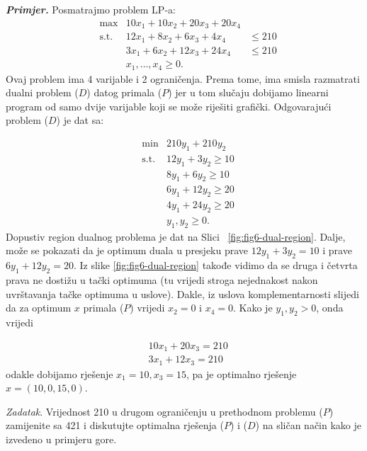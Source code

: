 \documentclass[a4paper, utf8, 11pt, colorlinks]{book}
\begin{document}
\emph{\textbf{Primjer.}} Posmatrajmo problem LP-a:
$$\begin{array}{llll}
   &\max                     &10 x_1 + 10 x_2 + 20 x_3 + 20 x_4  & \\
   &\mbox{s.t. }      &12 x_1 + 8 x_2  + 6 x_3  + 4 x_4   & \leq 210 \\
    &                        &3 x_1 + 6 x_2   + 12 x_3 + 24 x_4 & \leq 210 \\
     &                       & x_1,\ldots, x_4 \geq 0.                                 &
\end{array}
$$
Ovaj problem ima 4 varijable i 2 ograničenja. Prema tome, ima smisla razmatrati dualni problem  ($D$)  datog primala  ($P$)  jer u tom slučaju dobijamo linearni program od samo dvije varijable koji se može riješiti grafički.  Odgovarajući problem ($D$) je dat sa:

$$\begin{array}{lll}
    &\min                    &  210 y_1 + 210 y_2      \\
    &\mbox{s.t. }     &  12 y_1  + 3   y_2 \geq 10 \\
    &                        &  8  y_1 + 6    y_2 \geq 10 \\
    &                        &  6 y_1 + 12 y_2  \geq 20 \\
    &                        &  4 y_1 + 24 y_2  \geq 20 \\
    &                        &  y_1, y_2 \geq 0.
\end{array}$$
Dopustiv region dualnog problema je dat na Slici~ \ref{fig:fig6-dual-region}. %
Dalje, može se pokazati da je optimum duala u presjeku prave $12 y_1 + 3 y_2 = 10$ i prave $6y_1 + 12 y_2 = 20$. Iz slike \ref{fig:fig6-dual-region} takođe vidimo da se druga i četvrta prava ne dostižu u tački optimuma (tu vrijedi stroga nejednakost nakon uvrštavanja tačke optimuma u uslove). Dakle, iz uslova komplementarnosti slijedi da za optimum $x$ primala  ($P$)  vrijedi $x_2 = 0$ i $x_4 = 0$.  Kako je $y_1, y_2 > 0$, onda vrijedi 

\begin{align}
    &10 x_1 + 20 x_3 = 210 \nonumber \\
    & 3x_1 + 12 x_3  = 210 \nonumber
\end{align}
odakle dobijamo rješenje $x_1 = 10, x_3 = 15$, pa je optimalno rješenje $x = (10, 0, 15, 0)$.

\emph{Zadatak}. Vrijednost 210 u drugom ograničenju u prethodnom problemu  ($P$)  zamijenite sa 421 i diskutujte optimalna rješenja  ($P$)  i  ($D$)  na sličan način kako je izvedeno  u primjeru gore.
\end{document}
